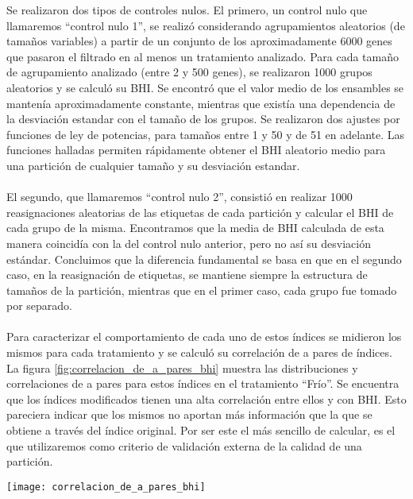 Se realizaron dos tipos de controles nulos. El primero, un control nulo que llamaremos ``control nulo 1'', se realizó considerando agrupamientos aleatorios (de tamaños variables) a partir de un conjunto de los aproximadamente 6000 genes que pasaron el filtrado en al menos un tratamiento analizado. Para cada tamaño de agrupamiento analizado (entre 2 y 500 genes), se realizaron 1000 grupos aleatorios y se calculó su BHI. Se encontró que el valor medio de los ensambles se mantenía aproximadamente constante, mientras que existía una dependencia de la desviación estandar con el tamaño de los grupos. Se realizaron dos ajustes por funciones de ley de potencias, para tamaños entre 1 y 50 y de 51 en adelante. Las funciones halladas permiten rápidamente obtener el BHI aleatorio medio para una partición de cualquier tamaño y su desviación estandar.\\\\
El segundo, que llamaremos ``control nulo 2'', consistió en realizar 1000 reasignaciones aleatorias de las etiquetas de cada partición y calcular el BHI de cada grupo de la misma. Encontramos que la media de BHI calculada de esta manera coincidía con la del control nulo anterior, pero no así su desviación estándar. Concluimos que la diferencia fundamental se basa en que en el segundo caso, en la reasignación de etiquetas, se mantiene siempre la estructura de tamaños de la partición, mientras que en el primer caso, cada grupo fue tomado por separado.\\\\
Para caracterizar el comportamiento de cada uno de estos índices se midieron los mismos para cada tratamiento y se calculó su correlación de a pares de índices. La figura \ref{fig:correlacion_de_a_pares_bhi} muestra las distribuciones y correlaciones de a pares para estos índices en el tratamiento ``Frío''. Se encuentra que los índices modificados tienen una alta correlación entre ellos y con BHI. Esto pareciera indicar que los mismos no aportan más información que la que se obtiene a través del índice original. Por ser este el más sencillo de calcular, es el que utilizaremos como criterio de validación externa de la calidad de una partición.
\begin{sidewaysfigure}
    \centering
    \texttt{[image: correlacion\_de\_a\_pares\_bhi]}
    \caption{Correlación de a pares para los distintos índices de homogeneidad biológica presentados para cada uno de los grupos del tratamiento 'Frío' obtenidos con $ds=1$. Se observa que todos los índices tienen una alta correlación entre si.\hl{que son las funciones de distribucion que aparecen}}
    \label{fig:correlacion_de_a_pares_bhi}
\end{sidewaysfigure}
\clearpage
